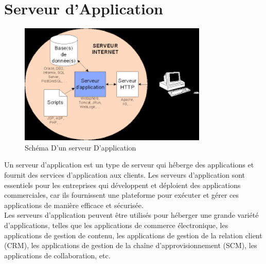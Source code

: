 \section{Serveur d'Application} 
	\begin{figure}[h]
	\begin{center}	
	\includegraphics[width=0.8\textwidth]{PhotoMemoire/serveur_application.png}
\caption{Schéma D'un serveur D'application\cite{7}}
\end{center}
\end{figure}
Un serveur d'application est un type de serveur qui héberge des applications et fournit des services d'application aux clients. Les serveurs d'application sont essentiels pour les entreprises qui développent et déploient des applications commerciales, car ils fournissent une plateforme pour exécuter et gérer ces applications de manière efficace et sécurisée.\\

Les serveurs d'application peuvent être utilisés pour héberger une grande variété d'applications, telles que les applications de commerce électronique, les applications de gestion de contenu, les applications de gestion de la relation client (CRM), les applications de gestion de la chaîne d'approvisionnement (SCM), les applications de collaboration, etc.\\

